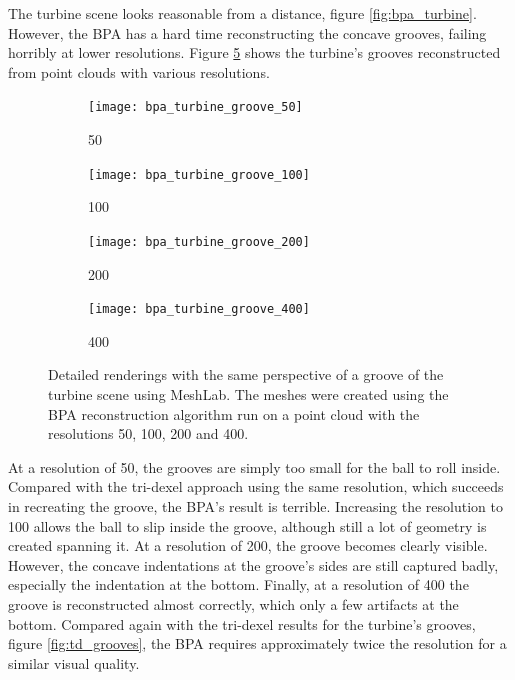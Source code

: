 The turbine scene looks reasonable from a distance, \cf figure \ref{fig:bpa_turbine}.
However, the BPA has a hard time reconstructing the concave grooves, failing horribly at lower resolutions.
Figure \ref{fig:bpa_grooves} shows the turbine's grooves reconstructed from point clouds with various resolutions.
%
\begin{figure}
	\centering
	\begin{subfigure}[b]{0.24\textwidth}
		\centering
		\texttt{[image: bpa\_turbine\_groove\_50]}
		\caption{50}
		\label{fig:bpa_turbine_groove_50}
	\end{subfigure}
	\begin{subfigure}[b]{0.24\textwidth}
		\centering
		\texttt{[image: bpa\_turbine\_groove\_100]}
		\caption{100}
		\label{fig:bpa_turbine_groove_100}
	\end{subfigure}
	\begin{subfigure}[b]{0.24\textwidth}
		\centering
		\texttt{[image: bpa\_turbine\_groove\_200]}
		\caption{200}
		\label{fig:bpa_turbine_groove_200}
	\end{subfigure}
	\begin{subfigure}[b]{0.24\textwidth}
		\centering
		\texttt{[image: bpa\_turbine\_groove\_400]}
		\caption{400}
		\label{fig:bpa_turbine_groove_400}
	\end{subfigure}
	\caption{
		Detailed renderings with the same perspective of a groove of the turbine scene using MeshLab.
		The meshes were created using the BPA reconstruction algorithm run on a point cloud with the resolutions 50, 100, 200 and 400.
	}
	\label{fig:bpa_grooves}
\end{figure}
%
At a resolution of 50, the grooves are simply too small for the ball to roll inside.
Compared with the tri-dexel approach using the same resolution, which succeeds in recreating the groove, the BPA's result is terrible.
Increasing the resolution to 100 allows the ball to slip inside the groove, although still a lot of geometry is created spanning it.
At a resolution of 200, the groove becomes clearly visible.
However, the concave indentations at the groove's sides are still captured badly, especially the indentation at the bottom.
Finally, at a resolution of 400 the groove is reconstructed almost correctly, which only a few artifacts at the bottom.
Compared again with the tri-dexel results for the turbine's grooves, \cf figure \ref{fig:td_grooves}, the BPA requires approximately twice the resolution for a similar visual quality.

